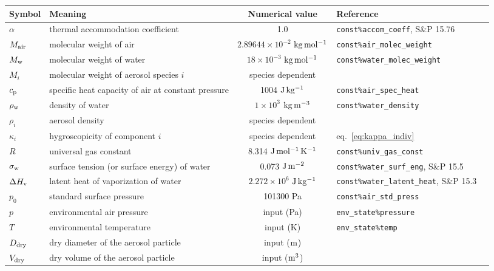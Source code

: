 \documentclass{article}
\begin{document}

\vspace{2cm}
\begin{tabular}{lp{4cm}clp{3cm}}
\hline Symbol & Meaning  & Numerical value &  Reference    \\
\hline             
$\alpha$   &  thermal accommodation coefficient    & 1.0 & \verb+const%accom_coeff+, S\&P 15.76 \\
$M_{\rm air} $      &  molecular weight of air      & $2.89644 \times 10^{-2} $  $\rm{kg \,mol^{-1}}$ &  \verb+const%air_molec_weight+   \\
$M_{\rm w} $    &  molecular weight of water        & $18\times10^{-3}$ $\rm{kg \, mol^{-1}}  $  &  \verb+const%water_molec_weight+    \\
$M_i $      &  molecular weight of aerosol species $i$  & species dependent &    \\
$c_{\rm p}$       &  specific heat capacity of air at constant pressure  & 1004 $\rm{J \, kg^{-1}}$ & \verb+const%air_spec_heat+     \\
$\rho_{\rm w}$ &  density of water & $1\times10^{3}$ $\rm{kg \, m^{-3}}  $ &   \verb+const%water_density+ \\ 
$ \rho_i$    &  aerosol density   & species dependent  &     \\
$\kappa_i$      &  hygroscopicity of component $i$   & species dependent  &  eq.~\ref{eq:kappa_indiv}   \\
$R$     &  universal gas constant  & 8.314 $\rm{J \, mol^{-1}\, K^{-1}}$   &  \verb+const%univ_gas_const+ \\
$\sigma_{\rm w}$     &  surface tension (or surface energy) of water  & 0.073 $\rm{J \, m^{-2}}$ & \verb+const%water_surf_eng+, S\&P 15.5  \\
$\Delta H_{\rm  v}$  & latent heat of vaporization of water   & $2.272\times10^{6}$ $\rm{J \, kg^{-1}}$ & \verb+const%water_latent_heat+, S\&P 15.3 \\ 
$p_0$ & standard surface pressure &  101300 Pa & \verb+const%air_std_press+ \\
$p$     &  environmental air pressure & input  (Pa) &  \verb+env_state%pressure+ \\
$T$     &  environmental temperature  & input  (K) &  \verb+env_state%temp+  \\
$D_{\rm dry}$       & dry diameter of the aerosol particle   & input ($\rm m$) &    \\
$V_{\rm dry}$       & dry volume of the aerosol particle   & input ($\rm m^3$) &    \\

\end{tabular}
\end{document}

